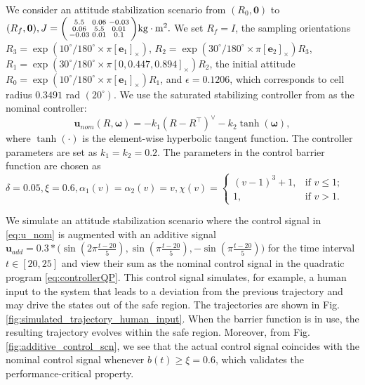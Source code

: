 \documentclass[letterpaper, 10 pt, journal, twoside]{IEEEtran}
\theoremstyle{plain}
\newcommand{\myvar}[1]{\bm{#1}}
\begin{document}
 We consider an attitude stabilization scenario from $(R_0, \myvar{0})$ to $(R_f, \myvar{0}), J = \begin{psmallmatrix}
5.5   & 0.06 & -0.03\\
0.06 &  5.5   & 0.01\\
-0.03 & 0.01 & 0.1
\end{psmallmatrix}  \textup{kg}\cdot\textup{m}^2. $ We set $ R_f = I $, the sampling orientations $ R_3= \exp(10^{\circ}/{180^\circ} \times {\pi}[\myvar{e}_1]_{\times})$, $ R_2= \exp(30^{\circ}/{180^\circ} \times {\pi}[\myvar{e}_2]_{\times})R_3$, $ R_1 = \exp(30^{\circ}/{180^\circ} \times {\pi}[0, 0.447,0.894]_{\times})R_2 $, the initial attitude $ R_0  =  \exp(10^{\circ}/{180^\circ} \times {\pi}[\myvar{e}_1]_{\times})R_1 $, and $\epsilon = 0.1206 $, which corresponds to cell radius  $0.3491 $ rad $(20^\circ)  $.  We use the saturated stabilizing controller from \cite{lee2012robust} as the nominal controller:
\begin{equation} \label{eq:u_nom}
       \myvar{u}_{nom}(R,\myvar{\omega}) =  -k_1(R- R^\top )^{\vee} -k_2 \tanh(\myvar{\omega}),
\end{equation}
where  $\tanh(\cdot)$ is the element-wise hyperbolic tangent function.  The controller parameters are set as $ k_1 = k_2 = 0.2$. The parameters in the control barrier function are chosen as $ \delta = 0.05,\xi = 0.6,\alpha_1(v) = \alpha_2(v) = v, \chi(v) =\left\{ \begin{smallmatrix} 
(v-1)^3+1, &   \text{if }v \le 1;\\
 1,  & \text{if }v > 1. 
\end{smallmatrix}\right. $




We simulate an attitude stabilization scenario where the control signal in \eqref{eq:u_nom} is augmented with an additive signal $ \myvar{u}_{add} = 0.3* \big(\sin(2\pi \tfrac{t-20}{5}), \sin(\pi \tfrac{t-20}{5}),-\sin(\pi \tfrac{t-20}{5}) \big) $ for the time interval $ t\in [20,25] $ and view their sum as the nominal control signal {in} the quadratic program \eqref{eq:controllerQP}. This control signal simulates, for example, a human input to the system that leads to a deviation from the previous trajectory and may drive the states out of the safe region. The trajectories are shown in Fig. \ref{fig:simulated_trajectory_human_input}. When the barrier function is in use, the resulting trajectory evolves within the  safe region. Moreover, from Fig. \ref{fig:additive_control_scn}, we see that the actual control signal coincides with the nominal control signal whenever $ b(t)\geq \xi = 0.6$, which validates the performance-critical property.
\end{document}
